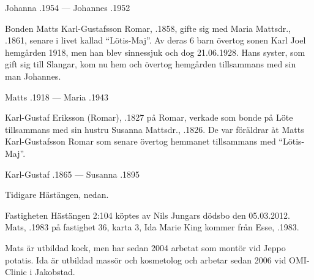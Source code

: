 Johanna .1954  ---  Johannes .1952


%
Bonden Matts Karl-Gustafsson Romar, .1858, gifte sig med Maria Mattsdr., .1861, senare i livet kallad ``Lötis-Maj''. Av deras 6 barn övertog sonen Karl Joel hemgården 1918, men han blev sinnessjuk och dog 21.06.1928. Hans syster, som gift sig till Slangar, kom nu hem och övertog hemgården tillsammans med sin man Johannes.

Matts .1918  ---  Maria .1943


%
Karl-Gustaf Eriksson (Romar), .1827 på Romar, verkade som bonde på Löte tillsammans med sin hustru Susanna Mattsdr., .1826. De var föräldrar åt Matts Karl-Gustafsson Romar som senare övertog hemmanet tillsammans med ``Lötis-Maj''.

Karl-Gustaf .1865  ---  Susanna .1895



%
Tidigare Hästängen, nedan.



%
Fastigheten Hästängen 2:104 köptes av Nils Jungars dödsbo den 05.03.2012. Mats, .1983 på fastighet 36, karta 3, Ida Marie King kommer från Esse, .1983.

Mats är utbildad kock, men har sedan 2004 arbetat som montör vid Jeppo potatis. Ida är utbildad massör och kosmetolog och arbetar sedan 2006 vid OMI-Clinic i Jakobstad.
\begin{jhchildren}
  \item {}
  \item {}
  \item {}
\end{jhchildren}

%

